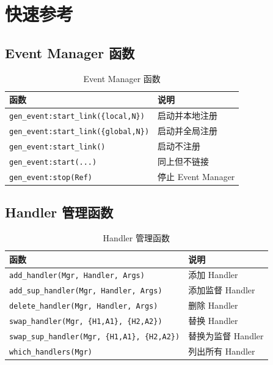 \documentclass[a4paper,11pt]{article}
\begin{document}
\section{快速参考}

\subsection{Event Manager 函数}

\begin{table}[H]
\centering
\begin{tabular}{@{}ll@{}}
\toprule
\textbf{函数} & \textbf{说明} \\
\midrule
\texttt{gen\_event:start\_link(\{local,N\})} & 启动并本地注册 \\
\texttt{gen\_event:start\_link(\{global,N\})} & 启动并全局注册 \\
\texttt{gen\_event:start\_link()} & 启动不注册 \\
\texttt{gen\_event:start(...)} & 同上但不链接 \\
\texttt{gen\_event:stop(Ref)} & 停止 Event Manager \\
\bottomrule
\end{tabular}
\caption{Event Manager 函数}
\end{table}

\subsection{Handler 管理函数}

\begin{table}[H]
\centering
\begin{tabular}{@{}ll@{}}
\toprule
\textbf{函数} & \textbf{说明} \\
\midrule
\texttt{add\_handler(Mgr, Handler, Args)} & 添加 Handler \\
\texttt{add\_sup\_handler(Mgr, Handler, Args)} & 添加监督 Handler \\
\texttt{delete\_handler(Mgr, Handler, Args)} & 删除 Handler \\
\texttt{swap\_handler(Mgr, \{H1,A1\}, \{H2,A2\})} & 替换 Handler \\
\texttt{swap\_sup\_handler(Mgr, \{H1,A1\}, \{H2,A2\})} & 替换为监督 Handler \\
\texttt{which\_handlers(Mgr)} & 列出所有 Handler \\
\bottomrule
\end{tabular}
\caption{Handler 管理函数}
\end{table}
\end{document}
